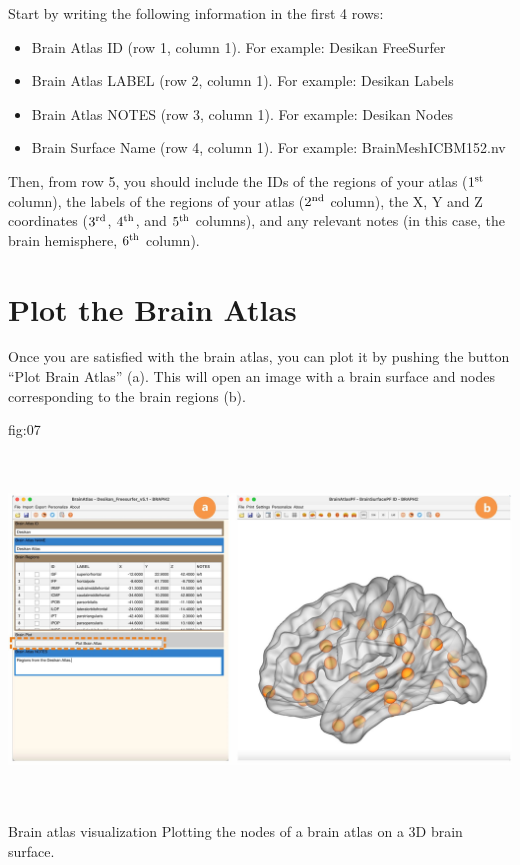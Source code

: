 \documentclass[justified]{tufte-handout}
\begin{document}
Start by writing the following information in the first 4 rows:
\begin{itemize}

\item Brain Atlas ID (row 1, column 1). 
For example: Desikan FreeSurfer

\item Brain Atlas LABEL (row 2, column 1). 
For example: Desikan Labels

\item Brain Atlas NOTES (row 3, column 1).
For example: Desikan Nodes

\item Brain Surface Name (row 4, column 1).
For example: BrainMeshICBM152.nv

\end{itemize}
Then, from row 5, you should include the IDs of the regions of your atlas ($1^{\rm st}$ column), the labels of the regions of your atlas ($2^{\rm nd}$ column), the X, Y and Z coordinates ($3^{\rm rd}$, $4^{\rm th}$, and $5^{\rm th}$ columns), and any relevant notes (in this case, the brain hemisphere, $6^{\rm th}$ column).	

\clearpage
\section{Plot the Brain Atlas}

Once you are satisfied with the brain atlas, you can plot it by pushing the button ``Plot Brain Atlas'' (a). 
This will open an image with a brain surface and nodes corresponding to the brain regions (b).

	{fig:07}
	{\includegraphics[height=10cm]{fig07.jpg}}
	{Brain atlas visualization}
	{
	Plotting the nodes of a brain atlas on a 3D brain surface. 
	}
	
\end{document}
